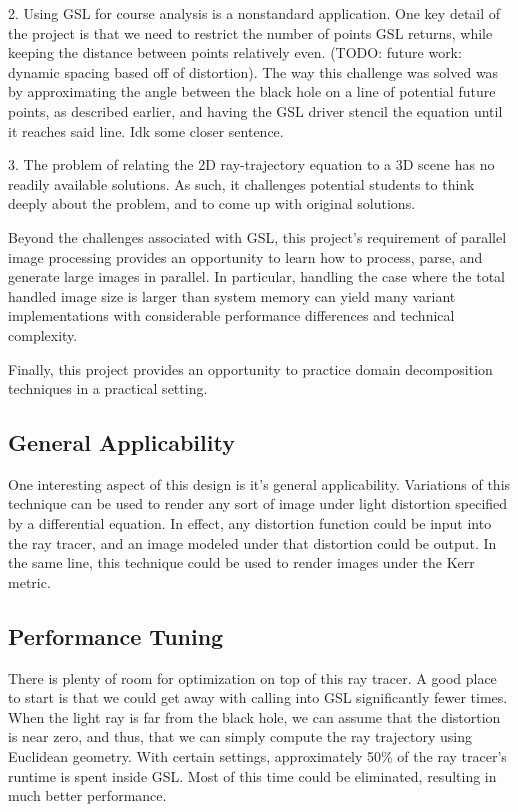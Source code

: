 2. Using GSL for course analysis is a nonstandard application. One key detail of the project is that we need to restrict the number of points GSL returns, while keeping the distance between points relatively even. (TODO: future work: dynamic spacing based off of distortion). The way this challenge was solved was by approximating the angle between the black hole on a line of potential future points, as described earlier, and having the GSL driver stencil the equation until it reaches said line. Idk some closer sentence.

3. The problem of relating the 2D ray-trajectory equation to a 3D scene has no readily available solutions. As such, it challenges potential students to think deeply about the problem, and to come up with original solutions.

Beyond the challenges associated with GSL, this project's requirement of parallel image processing provides an opportunity to learn how to process, parse, and generate large images in parallel. In particular, handling the case where the total handled image size is larger than system memory can yield many variant implementations with considerable performance differences and technical complexity. 

Finally, this project provides an opportunity to practice domain decomposition techniques in a practical setting. %


\subsection{General Applicability}
One interesting aspect of this design is it's general applicability. Variations of this technique can be used to render any sort of image under light distortion specified by a differential equation. In effect, any distortion function could be input into the ray tracer, and an image modeled under that distortion could be output. In the same line, this technique could be used to render images under the Kerr metric.


\subsection{Performance Tuning}
There is plenty of room for optimization on top of this ray tracer. A good place to start is that we could get away with calling into GSL significantly fewer times. When the light ray is far from the black hole, we can assume that the distortion is near zero, and thus, that we can simply compute the ray trajectory using Euclidean geometry. With certain settings, approximately 50\% of the ray tracer's runtime is spent inside GSL. Most of this time could be eliminated, resulting in much better performance. 

